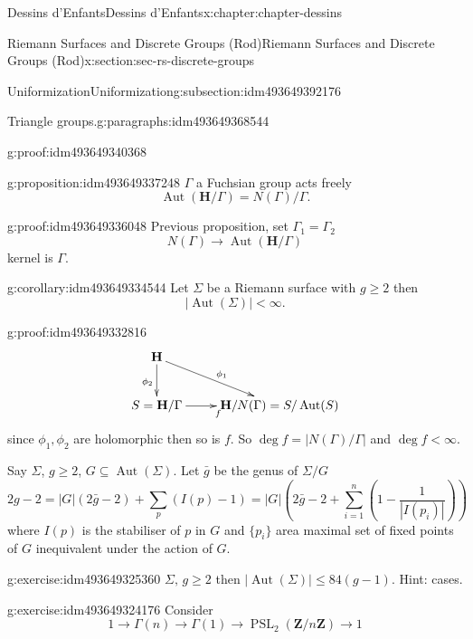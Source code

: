 \documentclass[oneside,10pt,]{book}
\numberwithin{equation}{section}
\newcommand{\ZZ}{\mathbf{Z}}
\newcommand{\HH}{\mathbf{H}}
\DeclareMathOperator{\Aut}{Aut}
\DeclareMathOperator{\PSL}{PSL}
\newcommand{\lt}{<}
\begin{document}
\begin{chapterptx}{Dessins d'Enfants}{}{Dessins d'Enfants}{}{}{x:chapter:chapter-dessins}
\begin{sectionptx}{Riemann Surfaces and Discrete Groups (Rod)}{}{Riemann Surfaces and Discrete Groups (Rod)}{}{}{x:section:sec-rs-discrete-groups}
\begin{subsectionptx}{Uniformization}{}{Uniformization}{}{}{g:subsection:idm493649392176}
\begin{paragraphs}{Triangle groups.}{g:paragraphs:idm493649368544}
\begin{proofptx}{}{g:proof:idm493649340368}
\end{proofptx}
\begin{proposition}{}{}{g:proposition:idm493649337248}%
\(\Gamma\) a Fuchsian group acts freely%
\begin{equation*}
\Aut(\HH/\Gamma) = N(\Gamma)/\Gamma\text{.}
\end{equation*}
%
\end{proposition}
\begin{proofptx}{}{g:proof:idm493649336048}
Previous proposition, set \(\Gamma_1 = \Gamma_2\)%
\begin{equation*}
N(\Gamma) \to \Aut(\HH/\Gamma)
\end{equation*}
kernel is \(\Gamma\).%
\end{proofptx}
\begin{corollary}{}{}{g:corollary:idm493649334544}%
Let \(\Sigma\) be a Riemann surface with \(g \ge 2\) then%
\begin{equation*}
|\Aut(\Sigma)| \lt \infty\text{.}
\end{equation*}
%
\end{corollary}
\begin{proofptx}{}{g:proof:idm493649332816}
%
\begin{equation*}
\xymatrix{
\HH \ar[dr]^{\phi_1} \ar[d]_{\phi_2}\\
S =\HH/\Gamma \ar[r]_f & \HH/N(\Gamma) = S/\Aut(S)
}
\end{equation*}
since \(\phi_1,\phi_2\) are holomorphic then so is \(f\). So \(\deg f=  | N(\Gamma) /\Gamma|\) and \(\deg f  \lt \infty\).%
\end{proofptx}
Say \(\Sigma\), \(g\ge 2\), \(G\subseteq \Aut(\Sigma)\). Let \(\bar g\) be the genus of \(\Sigma /G\)%
\begin{equation*}
2g - 2 = |G| (2\bar g - 2) + \sum_p (I(p) - 1) = |G|(2\bar g - 2 + \sum_{i=1}^n (1 - \frac{1}{|I(p_i)|}))
\end{equation*}
where \(I(p)\) is the stabiliser of \(p\) in \(G\) and \(\{p_i\}\) area maximal set of fixed points of \(G\) inequivalent under the action of \(G\).%
\begin{inlineexercise}{}{g:exercise:idm493649325360}%
\(\Sigma,\,g\ge 2\) then \(|\Aut(\Sigma)| \le 84(g-1)\). Hint: cases.%
\end{inlineexercise}
\begin{inlineexercise}{}{g:exercise:idm493649324176}%
Consider%
\begin{equation*}
1 \to \Gamma(n) \to \Gamma(1) \to \PSL_2(\ZZ/n\ZZ) \to 1
\end{equation*}

\end{inlineexercise}
\end{paragraphs}
\end{subsectionptx}
\end{sectionptx}
\end{chapterptx}
\end{document}
